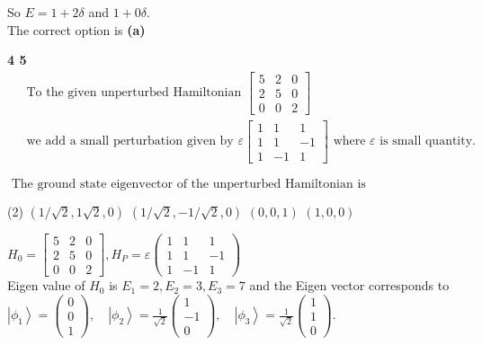 \begin{enumerate}
\begin{answer}
		So $E=1+2 \delta$ and $1+0 \delta$.	\\
		The correct option is \textbf{(a)}
	\end{answer}
	\textbf{ 4  5}\\
	$\begin{aligned}
	&\text { To the given unperturbed Hamiltonian }\left[\begin{array}{ccc}
	5 & 2 & 0 \\
	2 & 5 & 0 \\
	0 & 0 & 2
	\end{array}\right] \\
	&\text { we add a small perturbation given by } \varepsilon\left[\begin{array}{ccc}
	1 & 1 & 1 \\
	1 & 1 & -1 \\
	1 & -1 & 1
	\end{array}\right] \text { where } \varepsilon \text { is small quantity. }
	\end{aligned}$\\
	\begin{minipage}{\textwidth}
		\item $\text { The ground state eigenvector of the unperturbed Hamiltonian is }$
	\end{minipage}
	\begin{tasks}(2)
		\task[\textbf{A.}] $(1 / \sqrt{2}, 1 \sqrt{2}, 0)$
		\task[\textbf{B.}]$(1 / \sqrt{2},-1 / \sqrt{2}, 0)$
		\task[\textbf{C.}] $(0,0,1)$
		\task[\textbf{D.}]$(1,0,0)$
	\end{tasks}
	\begin{answer}
		$H_{0}=\left[\begin{array}{lll}
		5 & 2 & 0 \\
		2 & 5 & 0 \\
		0 & 0 & 2
		\end{array}\right], H_{P}=\varepsilon\left(\begin{array}{ccc}
		1 & 1 & 1 \\
		1 & 1 & -1 \\
		1 & -1 & 1
		\end{array}\right)$\\
		Eigen value of $H_{0}$ is $E_{1}=2, E_{2}=3, E_{3}=7$ and the Eigen vector corresponds to $\left|\phi_{1}\right\rangle=\left(\begin{array}{l}0 \\ 0 \\ 1\end{array}\right), \quad\left|\phi_{2}\right\rangle=\frac{1}{\sqrt{2}}\left(\begin{array}{c}1 \\ -1 \\ 0\end{array}\right), \quad\left|\phi_{3}\right\rangle=\frac{1}{\sqrt{2}}\left(\begin{array}{l}1 \\ 1 \\ 0\end{array}\right) .$\\

\end{answer}
\end{enumerate}
